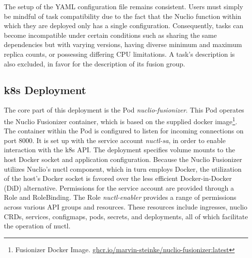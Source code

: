 The setup of the YAML configuration file remains consistent. Users must simply
be mindful of task compatibility due to the fact that the Nuclio function within
which they are deployed only has a single configuration. Consequently, tasks can
become incompatible under certain conditions such as sharing the same
dependencies but with varying versions, having diverse minimum and maximum
replica counts, or possessing differing CPU limitations. A task's description is
also excluded, in favor for the description of its fusion group.

\subsection{k8s Deployment}

The core part of this deployment is the Pod \emph{nuclio-fusionizer}. This Pod
operates the Nuclio Fusionizer container, which is based on the supplied docker
image\footnote{Fusionizer Docker Image.
\url{ghcr.io/marvin-steinke/nuclio-fusionizer:latest}}. The container within the
Pod is configured to listen for incoming connections on port 8000. It is set up
with the service account \emph{nuctl-sa}, in order to enable interaction with
the k8s API. The deployment specifies volume mounts to the host Docker socket
and application configuration. Because the Nuclio Fusionizer utilizes Nuclio's
nuctl component, which in turn employs Docker, the utilization of the host's
Docker socket is favored over the less efficient Docker-in-Docker (DiD)
alternative. Permissions for the service account are provided through a Role and
RoleBinding. The Role \emph{nuctl-enabler} provides a range of permissions
across various API groups and resources. These resources include ingresses,
nuclio CRDs, services, configmaps, pods, secrets, and deployments, all of which
facilitate the operation of nuctl.
